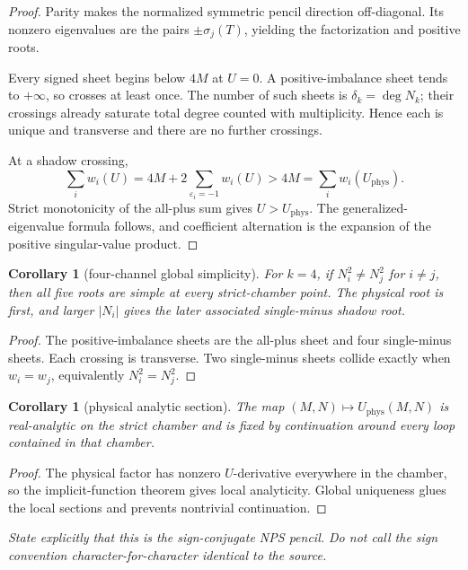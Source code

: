 \documentclass[11pt]{article}
\newtheorem{corollary}[theorem]{Corollary}
\theoremstyle{remark}
\newcommand{\proofstop}[1]{\par\medskip\noindent{\color{red!75!black}\textbf{STOP--PROOF.}} \textit{#1}\par\medskip}
\begin{document}
\begin{proof}
Parity makes the normalized symmetric pencil direction off-diagonal. Its
nonzero eigenvalues are the pairs $\pm\sigma_j(T)$, yielding the
factorization and positive roots.

Every signed sheet begins below $4M$ at $U=0$. A positive-imbalance sheet
tends to $+\infty$, so crosses at least once. The number of such sheets is
$\delta_k=\deg N_k$; their crossings already saturate total degree
counted with multiplicity. Hence each is unique and transverse and there
are no further crossings.

At a shadow crossing,
\[
\sum_iw_i(U)
=4M+2\sum_{\varepsilon_i=-1}w_i(U)
>4M=\sum_iw_i(U_{\mathrm{phys}}).
\]
Strict monotonicity of the all-plus sum gives $U>U_{\mathrm{phys}}$.
The generalized-eigenvalue formula follows, and coefficient alternation is
the expansion of the positive singular-value product.
\end{proof}

\begin{corollary}[four-channel global simplicity]
For $k=4$, if $N_i^2\neq N_j^2$ for $i\neq j$, then all five roots are
simple at every strict-chamber point. The physical root is first, and larger
$|N_i|$ gives the later associated single-minus shadow root.
\end{corollary}

\begin{proof}
The positive-imbalance sheets are the all-plus sheet and four single-minus
sheets. Each crossing is transverse. Two single-minus sheets collide exactly
when $w_i=w_j$, equivalently $N_i^2=N_j^2$.
\end{proof}

\begin{corollary}[physical analytic section]
The map $(M,N)\mapsto U_{\mathrm{phys}}(M,N)$ is real-analytic on the
strict chamber and is fixed by continuation around every loop contained in
that chamber.
\end{corollary}

\begin{proof}
The physical factor has nonzero $U$-derivative everywhere in the chamber, so
the implicit-function theorem gives local analyticity. Global uniqueness
glues the local sections and prevents nontrivial continuation.
\end{proof}

\proofstop{State explicitly that this is the sign-conjugate NPS pencil.
Do not call the sign convention character-for-character identical to the
source.}
\end{document}
